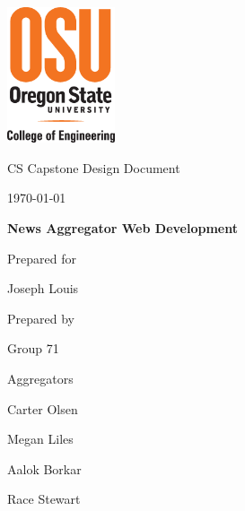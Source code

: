 \documentclass[onecolumn, draftclsnofoot,10pt, compsoc]{IEEEtran}
\def \CapstoneTeamName{Aggregators}
\def \CapstoneTeamNumber{71}
\def \GroupMemberOne{Carter Olsen}
\def \GroupMemberTwo{Megan Liles}
\def \GroupMemberThree{Aalok Borkar}
\def \GroupMemberFour{Race Stewart}
\def \CapstoneProjectName{News Aggregator Web Development}
\def \CapstoneSponsorPerson{Joseph Louis}
\def \DocType{		%
				Design Document
				}
\begin{document}
\begin{titlepage}
    \begin{singlespace}
    	\includegraphics[height=4cm]{coe_v_spot1}
        \hfill 
        \par\vspace{.2in}
        \centering
        \scshape{
            \huge CS Capstone \DocType \par
            {\large\today}\par
            \vspace{.5in}
            \textbf{\Huge\CapstoneProjectName}\par
            \vfill
            {\large Prepared for}\par
            \vspace{5pt}
            {\Large\CapstoneSponsorPerson\par}
            {\large Prepared by }\par
            Group \CapstoneTeamNumber\par
            \CapstoneTeamName\par 
            \vspace{5pt}
            {\Large
                \GroupMemberOne\par
                \GroupMemberTwo\par
                \GroupMemberThree\par
                \GroupMemberFour\par
            }
            \vspace{20pt}
        }
        \begin{abstract}
            This document describes the design components of the News Aggregator website. It is structured as follows. A brief overview section will outline the purpose, intended audience, definitions, and project context. This is followed by the body of the document which further details the design of the project. The design description defines the stakeholders, views and viewpoints defined in the IEEE 1016 format. The project was broken up into four components: the front end, the back end, the natural language processing model, accessibility, database management, scraping of RSS feeds and mobile-friendliness. Each of these sections are discussed in depth in terms of design description.

        \end{abstract}     
    \end{singlespace}
\end{titlepage}
\end{document}

